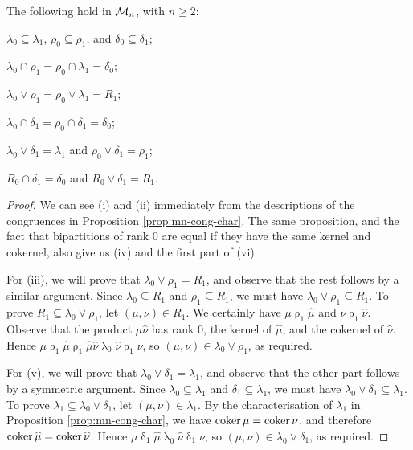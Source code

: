 \begin{lemma}
  \label{lem:mn-lattice-inter}
  The following hold in $\mathcal{M}_n$, with $n \geq 2$:
  \begin{enumerate}[\rm(i)]
    \begin{multicols}{2}
    \item $\lambda_0 \subseteq \lambda_1$, $\rho_0 \subseteq \rho_1$, and
      $\delta_0 \subseteq \delta_1$;
    \item $\lambda_0 \cap \rho_1 = \rho_0 \cap \lambda_1 = \delta_0$;
    \item $\lambda_0 \vee \rho_1 = \rho_0 \vee \lambda_1 = R_1$;
    \item $\lambda_0 \cap \delta_1 = \rho_0 \cap \delta_1 = \delta_0$;
    \item $\lambda_0 \vee \delta_1 = \lambda_1$ and
      $\rho_0 \vee \delta_1 = \rho_1$;
    \item $R_0 \cap \delta_1 = \delta_0$ and $R_0 \vee \delta_1 = R_1$.
    \end{multicols}
  \end{enumerate}
  \begin{proof}
    We can see (i) and (ii) immediately from the descriptions of the congruences
    in Proposition \ref{prop:mn-cong-char}.  The same proposition, and the fact
    that bipartitions of rank $0$ are equal if they have the same kernel and
    cokernel, also give us (iv) and the first part of (vi).

    For (iii), we will prove that $\lambda_0 \vee \rho_1 = R_1$, and observe
    that the rest follows by a similar argument.  Since
    $\lambda_0 \subseteq R_1$ and $\rho_1 \subseteq R_1$, we must have
    $\lambda_0 \vee \rho_1 \subseteq R_1$.  To prove
    $R_1 \subseteq \lambda_0 \vee \rho_1$, let $(\mu, \nu) \in R_1$.  We
    certainly have $\mu \mathrel\rho_1 \widehat\mu$ and
    $\nu \mathrel\rho_1 \widehat\nu$.  Observe that the product
    $\widehat\mu\widehat\nu$ has rank $0$, the kernel of $\widehat\mu$, and the
    cokernel of $\widehat\nu$.  Hence
    $\mu \mathrel\rho_1 \widehat\mu \mathrel\rho_1 \widehat\mu\widehat\nu
    \mathrel\lambda_0 \widehat\nu \mathrel\rho_1 \nu$, so
    $(\mu, \nu) \in \lambda_0 \vee \rho_1$, as required.

    For (v), we will prove that $\lambda_0 \vee \delta_1 = \lambda_1$, and
    observe that the other part follows by a symmetric argument.  Since
    $\lambda_0 \subseteq \lambda_1$ and $\delta_1 \subseteq \lambda_1$, we must
    have $\lambda_0 \vee \delta_1 \subseteq \lambda_1$.  To prove
    $\lambda_1 \subseteq \lambda_0 \vee \delta_1$, let
    $(\mu, \nu) \in \lambda_1$.  By the characterisation of $\lambda_1$ in
    Proposition \ref{prop:mn-cong-char}, we have $\operatorname{coker}\mu = \operatorname{coker}\nu$, and
    therefore $\operatorname{coker}\widehat\mu = \operatorname{coker}\widehat\nu$.  Hence
    $\mu \mathrel\delta_1 \widehat\mu \mathrel\lambda_0 \widehat\nu
    \mathrel\delta_1 \nu$, so $(\mu, \nu) \in \lambda_0 \vee \delta_1$, as
    required.


\end{proof}
\end{lemma}
